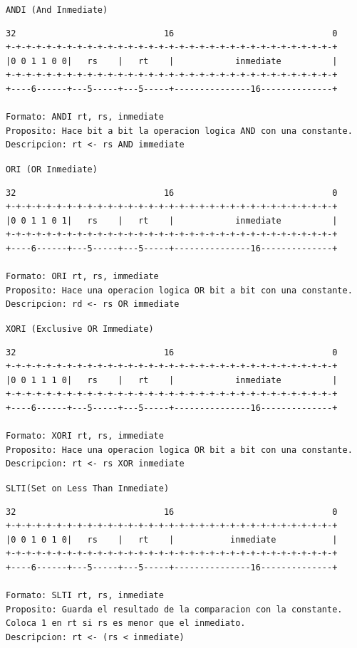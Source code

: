 \texttt{ANDI (And Inmediate)}

\begin{lstlisting}[style=consola]
32                             16                               0
+-+-+-+-+-+-+-+-+-+-+-+-+-+-+-+-+-+-+-+-+-+-+-+-+-+-+-+-+-+-+-+-+
|0 0 1 1 0 0|   rs    |   rt    |            inmediate          |
+-+-+-+-+-+-+-+-+-+-+-+-+-+-+-+-+-+-+-+-+-+-+-+-+-+-+-+-+-+-+-+-+
+----6------+---5-----+---5-----+---------------16--------------+

Formato: ANDI rt, rs, inmediate
Proposito: Hace bit a bit la operacion logica AND con una constante.
Descripcion: rt <- rs AND immediate
\end{lstlisting}

\texttt{ORI (OR Inmediate)}

\begin{lstlisting}[style=consola]
32                             16                               0
+-+-+-+-+-+-+-+-+-+-+-+-+-+-+-+-+-+-+-+-+-+-+-+-+-+-+-+-+-+-+-+-+
|0 0 1 1 0 1|   rs    |   rt    |            inmediate          |
+-+-+-+-+-+-+-+-+-+-+-+-+-+-+-+-+-+-+-+-+-+-+-+-+-+-+-+-+-+-+-+-+
+----6------+---5-----+---5-----+---------------16--------------+

Formato: ORI rt, rs, immediate
Proposito: Hace una operacion logica OR bit a bit con una constante.
Descripcion: rd <- rs OR immediate
\end{lstlisting}

\texttt{XORI (Exclusive OR Immediate)}

\begin{lstlisting}[style=consola]
32                             16                               0
+-+-+-+-+-+-+-+-+-+-+-+-+-+-+-+-+-+-+-+-+-+-+-+-+-+-+-+-+-+-+-+-+
|0 0 1 1 1 0|   rs    |   rt    |            inmediate          |
+-+-+-+-+-+-+-+-+-+-+-+-+-+-+-+-+-+-+-+-+-+-+-+-+-+-+-+-+-+-+-+-+
+----6------+---5-----+---5-----+---------------16--------------+

Formato: XORI rt, rs, immediate
Proposito: Hace una operacion logica OR bit a bit con una constante.
Descripcion: rt <- rs XOR inmediate
\end{lstlisting}

\texttt{SLTI(Set on Less Than Inmediate)}

\begin{lstlisting}[style=consola]
32                             16                               0
+-+-+-+-+-+-+-+-+-+-+-+-+-+-+-+-+-+-+-+-+-+-+-+-+-+-+-+-+-+-+-+-+
|0 0 1 0 1 0|   rs    |   rt    |           inmediate           |
+-+-+-+-+-+-+-+-+-+-+-+-+-+-+-+-+-+-+-+-+-+-+-+-+-+-+-+-+-+-+-+-+
+----6------+---5-----+---5-----+---------------16--------------+

Formato: SLTI rt, rs, inmediate
Proposito: Guarda el resultado de la comparacion con la constante. Coloca 1 en rt si rs es menor que el inmediato.
Descripcion: rt <- (rs < inmediate)
\end{lstlisting}

